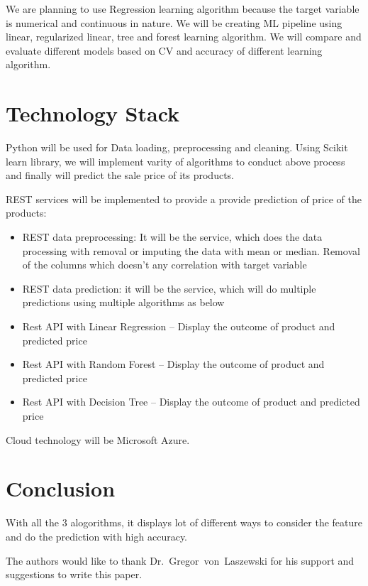 We are planning to use Regression learning algorithm because the target variable is 
numerical and continuous in nature. We will be creating ML pipeline using linear, 
regularized linear, tree and forest learning algorithm. We will compare and evaluate 
different models based on CV and accuracy of different learning algorithm.

\section{Technology Stack}

Python will be used for Data loading, preprocessing and cleaning. Using Scikit learn 
library, we will implement varity of algorithms to conduct above process and finally 
will predict the sale price of its products.

REST services will be implemented to provide a provide prediction of price of the 
products:

\begin{itemize}
\item REST data preprocessing: It will be the service, which does the data processing 
with removal or imputing the data with mean or median. Removal of the columns which 
doesn’t any correlation with target variable
\item REST data prediction: it will be the service, which will do multiple predictions 
using multiple algorithms as below

\item Rest API with Linear Regression – Display the outcome of product and predicted 
price
\item Rest API with Random Forest – Display the outcome of product and predicted price
\item Rest API with Decision Tree – Display the outcome of product and predicted price
\end{itemize}

Cloud technology will be Microsoft Azure.

\section{Conclusion}

With all the 3 alogorithms, it displays lot of different ways to consider the feature
and do the prediction with high accuracy.


\begin{acks}

  The authors would like to thank Dr.~Gregor~von~Laszewski for his
  support and suggestions to write this paper.

\end{acks}


 

